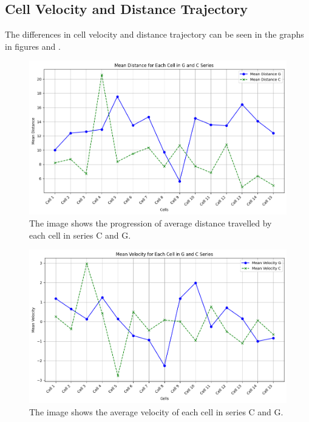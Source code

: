 \documentclass{article}
\begin{document}
\subsection*{Cell Velocity and Distance Trajectory}

The differences in cell velocity and distance trajectory can be seen in the graphs in figures and . 


\begin{figure}[h!]
\centering
\includegraphics[width=0.75\linewidth]{Report/RImages/Graphs/mean_distance_g_and_c.png}
\caption{\label{fig:ChoiceofCells-ControlSeries}The image shows the progression of average distance travelled by each cell in series C and G.}
\end{figure}

\begin{figure}[h!]
\centering
\includegraphics[width=0.75\linewidth]{Report/RImages/Graphs/mean_velocity_g_and_c.png}
\caption{\label{fig:ChoiceofCells-ControlSeries}The image shows the average velocity of each cell in series C and G.}
\end{figure}
\end{document}
